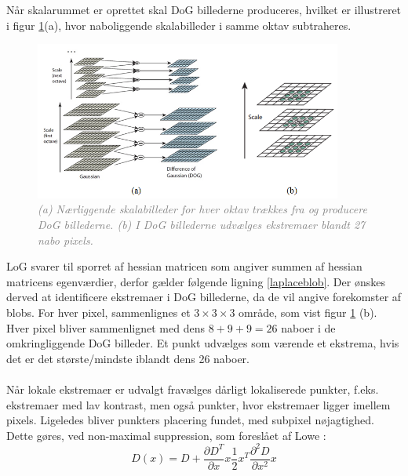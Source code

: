 Når skalarummet er oprettet skal DoG billederne produceres, hvilket er illustreret i figur \ref{fig:difference}(a), hvor naboliggende skalabilleder i samme oktav subtraheres. \begin{figure}[H]
    \centering
    \includegraphics[width=0.90\textwidth]{fig/30.png}
     \vspace{-1em}
    \begin{center}    
       \caption{\textcolor{gray}{\footnotesize \textit{(a) Nærliggende skalabilleder for hver oktav trækkes fra og producere DoG billederne. (b) I DoG billederne udvælges ekstremaer blandt 27 nabo pixels.}}}
    \label{fig:difference}
     \end{center}
     \vspace{-2.5em}
  \end{figure} \noindent    
LoG svarer til sporret af hessian matricen som angiver summen af hessian matricens egenværdier, derfor gælder følgende ligning \eqref{laplaceblob}. Der ønskes derved at identificere ekstremaer i DoG billederne, da de vil angive forekomster af blobs. For hver pixel, sammenlignes et $3\times3\times3$ område, som vist figur \ref{fig:difference} (b). Hver pixel bliver sammenlignet med dens $8+9+9=26$ naboer i de omkringliggende DoG billeder. Et punkt udvælges som værende et ekstrema, hvis det er det største/mindste iblandt dens 26 naboer.
\\
\\
Når lokale ekstremaer er udvalgt fravælges dårligt lokaliserede punkter, f.eks. ekstremaer med lav kontrast, men også punkter, hvor ekstremaer ligger imellem pixels. Ligeledes bliver punkters placering fundet, med subpixel nøjagtighed. Dette gøres, ved non-maximal suppression, som foreslået af Lowe \cite{nonmaximalsuppression}:
\begin{equation}
D(x)=D+\dfrac{\partial D^T}{\partial x}x\dfrac{1}{2}x^T\dfrac{\partial^2D}{\partial x^2}x
\label{nonmax}
\end{equation}
